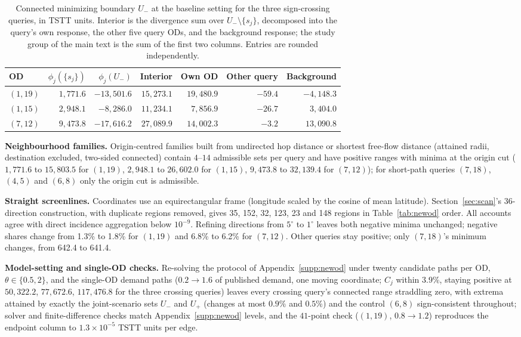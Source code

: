 \begin{table}[pos=tbh]
\footnotesize
\caption{Connected minimizing boundary $U_-$ at the baseline setting
for the three sign-crossing queries, in TSTT units. Interior is the
divergence sum over $U_-\setminus\{s_j\}$, decomposed into the query's
own response, the other five query ODs, and the background response;
the study group of the main text is the sum of the first two columns.
Entries are rounded independently.}
\label{tab:negmech}
\small
\begin{tabular*}{\tblwidth}{@{\extracolsep{\fill}}lrrrrrr}
\toprule
OD & $\phi_j(\{s_j\})$ & $\phi_j(U_-)$ & Interior & Own OD & Other query & Background\\
\midrule
$(1,19)$ & $1{,}771.6$ & $-13{,}501.6$ & $15{,}273.1$ & $19{,}480.9$ & $-59.4$ & $-4{,}148.3$ \\
$(1,15)$ & $2{,}948.1$ & $-8{,}286.0$ & $11{,}234.1$ & $7{,}856.9$ & $-26.7$ & $3{,}404.0$ \\
$(7,12)$ & $9{,}473.8$ & $-17{,}616.2$ & $27{,}089.9$ & $14{,}002.3$ & $-3.2$ & $13{,}090.8$ \\
\bottomrule
\end{tabular*}
\end{table}

\textbf{Neighbourhood families.}
Origin-centred families built from undirected hop distance or
shortest free-flow distance (attained radii, destination excluded,
two-sided connected) contain $4$--$14$ admissible sets per query and
have positive ranges with minima at the origin cut ($1{,}771.6$ to
$15{,}803.5$ for $(1,19)$, $2{,}948.1$ to $26{,}602.0$ for $(1,15)$,
$9{,}473.8$ to $32{,}139.4$ for $(7,12)$); for short-path queries
$(7,18)$, $(4,5)$ and $(6,8)$ only the origin cut is admissible.

\textbf{Straight screenlines.}
Coordinates use an equirectangular frame (longitude scaled by the cosine
of mean latitude). Section~\ref{sec:scan}'s 36-direction construction,
with duplicate regions removed, gives 35, 152, 32, 123, 23 and 148
regions in Table~\ref{tab:newod} order. All accounts agree with direct
incidence aggregation below $10^{-9}$. Refining directions from
$5^\circ$ to $1^\circ$ leaves both negative minima unchanged; negative
shares change from 1.3\% to 1.8\% for $(1,19)$ and 6.8\% to 6.2\%
for $(7,12)$. Other queries stay positive; only $(7,18)$'s minimum
changes, from 642.4 to 641.4.

\textbf{Model-setting and single-OD checks.}
Re-solving the protocol of Appendix~\ref{supp:newod} under twenty
candidate paths per OD, $\theta\in\{0.5,2\}$, and the single-OD
demand paths ($0.2\to1.6$ of published demand, one moving coordinate;
$C_j$ within $3.9\%$, staying positive at $50{,}322.2$,
$77{,}672.6$, $117{,}476.8$ for the three crossing queries) leaves
every crossing query's connected range straddling zero, with extrema
attained by exactly the joint-scenario sets $U_-$ and $U_+$ (changes
at most $0.9\%$ and $0.5\%$) and the control $(6,8)$
sign-consistent throughout; solver and finite-difference checks match
Appendix~\ref{supp:newod} levels, and the $41$-point check ($(1,19)$,
$0.8\to1.2$) reproduces the endpoint column to $1.3\times10^{-5}$
TSTT units per edge.

